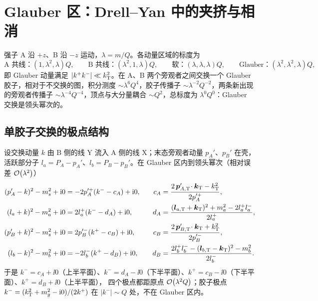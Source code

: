 
\section{Glauber 区：Drell--Yan 中的夹挤与相消}\label{sec:glb-dy}

强子 A 沿 $+z$、B 沿 $-z$ 运动，$\lambda=m/Q$。各动量区域的标度为
\begin{equation}\label{eq:glb-scalings}
\text{A 共线：}(1,\lambda^2,\lambda)Q,\qquad \text{B 共线：}(\lambda^2,1,\lambda)Q,\qquad
\text{软：}(\lambda,\lambda,\lambda)Q,\qquad \text{Glauber：}(\lambda^2,\lambda^2,\lambda)Q ,
\end{equation}
即 Glauber 动量满足 $|k^+k^-|\ll k_{\mathrm{T}}^2$。在 A、B 两个旁观者之间交换一个 Glauber 胶子，相对于不交换的图，积分测度
$\sim\lambda^6Q^4$，胶子传播子 $\sim\lambda^{-2}Q^{-2}$，两条新出现的旁观者传播子 $\sim\lambda^{-4}Q^{-4}$，顶点与大分量耦合
$\sim Q^2$，总标度为 $\lambda^0Q^0$：Glauber 交换是领头幂次的。%

\subsection{单胶子交换的极点结构}

设交换动量 $k$ 由 B 侧的线 Y 流入 A 侧的线 X；末态旁观者动量 $p_A'$、$p_B'$ 在壳，活跃部分子
$l_a=P_A-p_A'$、$l_b=P_B-p_B'$。在 Glauber 区内到领头幂次（相对误差 $\mathcal{O}\!\left(\lambda^2\right)$）
\begin{equation}\label{eq:glb-dens}
\begin{aligned}
(p_A'-k)^2-m_s^2+\mathrm{i}0&=-2p_A'^{+}(k^--c_A)+\mathrm{i}0, &\quad c_A&=\frac{2\,\bm p'_{A,\mathrm T}\!\cdot\bm k_{\mathrm T}-k_{\mathrm{T}}^2}{2p_A'^{+}},\\
(l_a+k)^2-m_a^2+\mathrm{i}0&=2l_a^{+}(k^--d_A)+\mathrm{i}0, & d_A&=\frac{(\bm l_{a,\mathrm T}+\bm k_{\mathrm T})^2+m_a^2-2l_a^+l_a^-}{2l_a^{+}},\\
(p_B'+k)^2-m_s^2+\mathrm{i}0&=2p_B'^{-}(k^+-c_B)+\mathrm{i}0, & c_B&=\frac{2\,\bm p'_{B,\mathrm T}\!\cdot\bm k_{\mathrm T}+k_{\mathrm{T}}^2}{2p_B'^{-}},\\
(l_b-k)^2-m_b^2+\mathrm{i}0&=-2l_b^{-}(k^+-d_B)+\mathrm{i}0, & d_B&=\frac{2l_b^+l_b^--(\bm l_{b,\mathrm T}-\bm k_{\mathrm T})^2-m_b^2}{2l_b^{-}} .
\end{aligned}
\end{equation}
于是 $k^-=c_A+\ii0$（上半平面）、$k^-=d_A-\ii0$（下半平面）、$k^+=c_B-\ii0$（下半平面）、$k^+=d_B+\ii0$（上半平面），
四个极点都距原点 $\mathcal{O}\!\left(\lambda^2Q\right)$；胶子极点 $k^-=(k_{\mathrm{T}}^2+m_g^2-\mathrm{i}0)/(2k^+)$ 在 $|k^-|\sim Q$ 处，不在 Glauber 区内。

